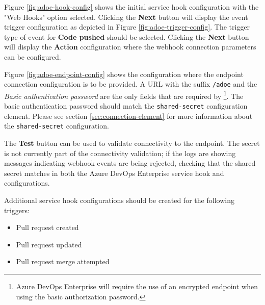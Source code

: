 Figure \ref{fig:adoe-hook-config} shows the initial service hook configuration with the 
"Web Hooks" option selected.  Clicking the \textbf{Next} button will display the 
event trigger configuration as depicted in Figure \ref{fig:adoe-trigger-config}. 
The trigger type of event for \textbf{Code pushed} should be selected.
Clicking the \textbf{Next} button will display the \textbf{Action} configuration
where the webhook connection parameters can be configured.

Figure \ref{fig:adoe-endpoint-config} shows the configuration where the \cxoneflow
endpoint connection configuration is to be provided.  A URL with the suffix
\texttt{/adoe} and the \textit{Basic authentication password} are the only
fields that are required by \cxoneflow\footnote{Azure DevOps Enterprise will require
the use of an encrypted endpoint when using the basic authorization password.}.
The basic authentication password should match the \texttt{shared-secret} \cxoneflow
configuration element.  Please see section \ref{sec:connection-element}
for more information about the \texttt{shared-secret} configuration.

The \textbf{Test} button can be used to validate connectivity to the \cxoneflow endpoint.
The secret is not currently part of the connectivity validation; if the \cxoneflow logs
are showing messages indicating webhook events are being rejected, checking that the
shared secret matches in both the Azure DevOps Enterprise service hook and \cxoneflow
configurations.

Additional service hook configurations should be created for the following triggers:

\begin{itemize}
    \item Pull request created
    \item Pull request updated
    \item Pull request merge attempted
\end{itemize}

